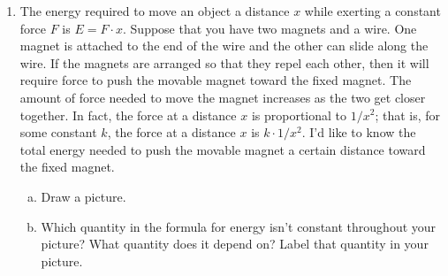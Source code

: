 \documentclass[12pt]{article}
\newenvironment{red}{\color{red}}{\ignorespacesafterend}
\begin{document}
\begin{enumerate}
\begin{enumerate}[(a)]
    \begin{red}
        I'm going to leave $k$ as a letter until the very end.
        \begin{align*}
            E_{total} &= \int_{6371000}^{368371000}\frac{k}{r^2}\,dr = \frac{-k}{r}\bigg|_{6371000}^{368371000} 
            = -k\left(\frac{1}{368371000} - \frac{1}{6371000}\right) \\
            &= -k\cdot\num{-1.54247e-7} = \num{7.956e14}\cdot\num{1.54203e-7} = \SI{1.227e8}{J}.
            \end{align*}
            So, the total energy required to move the CubeSat to the moon is  $\SI{1.227e8}{J}$.
    \end{red}
    \item Describe the meaning of each factor of your integral, and give its units.
    \begin{red}
        \[\int_{6371000}^{368371000} \underbrace{ \underbrace{\frac{k}{r^2} }_{\text{Force required at \(r\) (N)}\quad } \underbrace{dr}_{\quad \text{Distance moved (m)} } }_{ \text{Energy to move the 1 kg payload a distance \(dr\) (J)}} \]
    \end{red}
\end{enumerate}

\item The energy required to move an object a distance \(x\) while exerting a constant force \(F\) is \(E = F\cdot x\).  Suppose that you have two magnets and a wire. One magnet is attached to the end of the wire and the other can slide along the wire. If the magnets are arranged so that they repel each other, then it will require force to push the movable magnet toward the fixed magnet. The amount of force needed to move the magnet increases as the two get closer together. In fact, the force at a distance \(x\) is proportional to \(1/x^2\); that is, for some constant $k$, the force at a distance $x$ is $k\cdot 1/x^2$. I'd like to know the total energy needed to push the movable magnet a certain distance toward the fixed magnet.
\begin{enumerate}[(a)]
    \item Draw a picture.
    \item Which quantity in the formula for energy isn't constant throughout your picture? What quantity does it depend on? Label that quantity in your picture.


\end{enumerate}
\end{enumerate}
\end{document}

